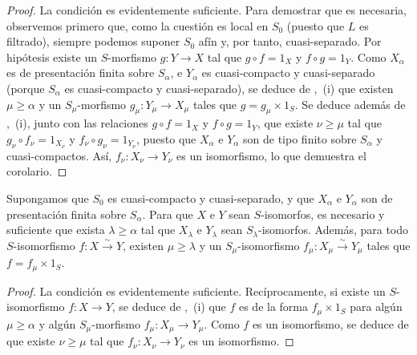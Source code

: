 \begin{proof}
La condición es evidentemente suficiente. Para demostrar que es necesaria, observemos primero que, como la cuestión es local en $S_0$ (puesto que $L$ es filtrado), siempre podemos suponer $S_0$ afín y, por tanto, cuasi-separado. Por hipótesis existe un $S$-morfismo $g:Y\to X$ tal que $g\circ f=1_X$ y $f\circ g=1_Y$. Como $X_\alpha$ es de presentación finita sobre $S_\alpha$, e $Y_\alpha$ es cuasi-compacto y cuasi-separado (porque $S_\alpha$ es cuasi-compacto y cuasi-separado), se deduce de ,~(i) que existen $\mu\geqslant\alpha$ y un $S_\mu$-morfismo $g_\mu:Y_\mu\to X_\mu$ tales que $g=g_\mu\times 1_S$. Se deduce además de ,~(i), junto con las relaciones $g\circ f=1_X$ y $f\circ g=1_Y$, que existe $\nu\geqslant\mu$ tal que $g_\nu\circ f_\nu=1_{X_\nu}$ y $f_\nu\circ g_\nu=1_{Y_\nu}$, puesto que $X_\alpha$ e $Y_\alpha$ son de tipo finito sobre $S_\alpha$ y cuasi-compactos. Así, $f_\nu:X_\nu\to Y_\nu$ es un isomorfismo, lo que demuestra el corolario.
\end{proof}

\begin{corollary}[8.8.2.5]
\label{IV.8.8.2.5}
Supongamos que $S_0$ es cuasi-compacto y cuasi-separado, y que $X_\alpha$ e $Y_\alpha$ son de presentación finita sobre $S_\alpha$.
Para que $X$ e $Y$ sean $S$-isomorfos, es necesario y suficiente que exista $\lambda\geqslant\alpha$ tal que $X_\lambda$ e $Y_\lambda$ sean $S_\lambda$-isomorfos. Además, para todo $S$-isomorfismo $f:X\xrightarrow{\sim}Y$, existen $\mu\geqslant\lambda$ y un $S_\mu$-isomorfismo $f_\mu:X_\mu\xrightarrow{\sim}Y_\mu$ tales que $f=f_\mu\times 1_S$.
\end{corollary}

\begin{proof}
La condición es evidentemente suficiente. Recíprocamente, si existe un $S$-isomorfismo $f:X\to Y$, se deduce de ,~(i) que $f$ es de la forma $f_\mu\times 1_S$ para algún $\mu\geqslant\alpha$ y algún $S_\mu$-morfismo $f_\mu:X_\mu\to Y_\mu$. Como $f$ es un isomorfismo, se deduce de  que existe $\nu\geqslant\mu$ tal que $f_\nu:X_\nu\to Y_\nu$ es un isomorfismo.
\end{proof}

